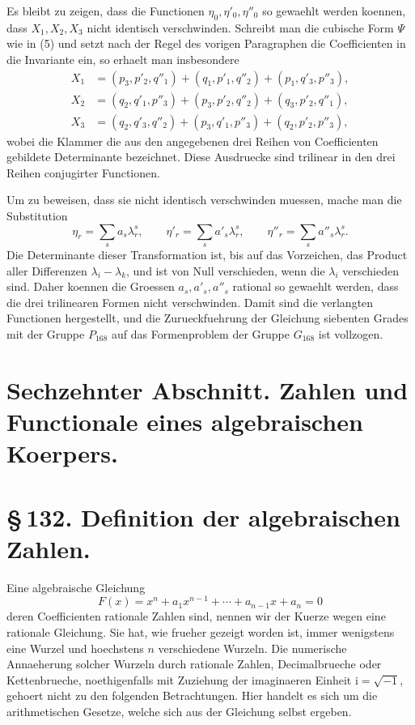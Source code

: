 \documentclass[11pt]{article}
\providecommand{\ii}{\mathrm{i}}
\begin{document}
Es bleibt zu zeigen, dass die Functionen \(\eta_0,\eta'_0,\eta''_0\) so gewaehlt werden koennen, dass \(X_1,X_2,X_3\) nicht identisch verschwinden. Schreibt man die cubische Form \(\Psi\) wie in (5) und setzt nach der Regel des vorigen Paragraphen die Coefficienten in die Invariante ein, so erhaelt man insbesondere
\begin{equation}
\begin{aligned}
X_1&=(p_3,p'_2,q''_1)+(q_1,p'_1,q''_2)+(p_1,q'_3,p''_3),\\
X_2&=(q_2,q'_1,p''_3)+(p_3,p'_2,q''_2)+(q_3,p'_2,q''_1),\\
X_3&=(q_2,q'_3,q''_2)+(p_3,q'_1,p''_3)+(q_2,p'_2,p''_3),
\end{aligned}
\tag{1}
\end{equation}
wobei die Klammer die aus den angegebenen drei Reihen von Coefficienten gebildete Determinante bezeichnet. Diese Ausdruecke sind trilinear in den drei Reihen conjugirter Functionen.

Um zu beweisen, dass sie nicht identisch verschwinden muessen, mache man die Substitution
\begin{equation}
\eta_r=\sum_s a_s\lambda_r^s,
\qquad
\eta'_r=\sum_s a'_s\lambda_r^s,
\qquad
\eta''_r=\sum_s a''_s\lambda_r^s.
\tag{2}
\end{equation}
Die Determinante dieser Transformation ist, bis auf das Vorzeichen, das Product aller Differenzen \(\lambda_i-\lambda_k\), und ist von Null verschieden, wenn die \(\lambda_i\) verschieden sind. Daher koennen die Groessen \(a_s,a'_s,a''_s\) rational so gewaehlt werden, dass die drei trilinearen Formen nicht verschwinden. Damit sind die verlangten Functionen hergestellt, und die Zurueckfuehrung der Gleichung siebenten Grades mit der Gruppe \(P_{168}\) auf das Formenproblem der Gruppe \(G_{168}\) ist vollzogen.




\section*{Sechzehnter Abschnitt. Zahlen und Functionale eines algebraischen Koerpers.}

\section*{\S\,132. Definition der algebraischen Zahlen.}

Eine algebraische Gleichung
\begin{equation}
F(x)=x^n+a_1x^{n-1}+\cdots +a_{n-1}x+a_n=0
\tag{1}
\end{equation}
deren Coefficienten rationale Zahlen sind, nennen wir der Kuerze
wegen eine rationale Gleichung. Sie hat, wie frueher gezeigt worden
ist, immer wenigstens eine Wurzel und hoechstens \(n\) verschiedene
Wurzeln. Die numerische Annaeherung solcher Wurzeln durch rationale
Zahlen, Decimalbrueche oder Kettenbrueche, noethigenfalls mit
Zuziehung der imaginaeren Einheit \(\ii=\sqrt{-1}\), gehoert nicht zu
den folgenden Betrachtungen. Hier handelt es sich um die
arithmetischen Gesetze, welche sich aus der Gleichung selbst ergeben.
\end{document}
